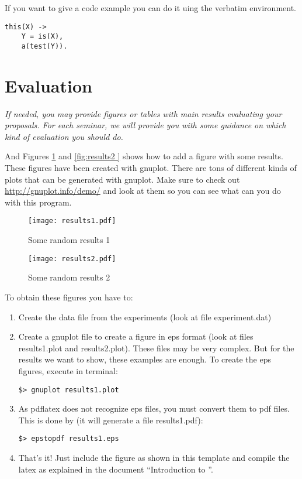 \documentclass[a4paper, 11pt]{article}
\begin{document}
If you want to give a code example you can do it uing the verbatim environment.
\begin{verbatim}
this(X) ->
    Y = is(X),
    a(test(Y)).
\end{verbatim}

\section{Evaluation}

\textit{If needed, you may provide figures or tables with main results
  evaluating your proposals. For each seminar, we will provide you
  with some guidance on which kind of evaluation you should do.}


And Figures \ref{fig:results1} and \ref{fig:results2 } shows how to
add a figure with some results. These figures have been created with
gnuplot. There are tons of different kinds of plots that can be
generated with gnuplot. Make sure to check out
\url{http://gnuplot.info/demo/} and look at them so you can see what
can you do with this program.


\begin{figure}
  \begin{center}
    \texttt{[image: results1.pdf]}
    \caption{Some random results 1}
    \label{fig:results1}
  \end{center}
\end{figure}


\begin{figure}
  \begin{center}
    \texttt{[image: results2.pdf]}
    \caption{Some random results 2}
    \label{fig:results2}
  \end{center}
\end{figure}

To obtain these figures you have to:
\begin{enumerate}

\item Create the data file from the experiments (look at file
  experiment.dat)

\item Create a gnuplot file to create a figure in eps format (look at
  files results1.plot and results2.plot). These files may be very
  complex. But for the results we want to show, these examples are
  enough. To create the eps figures, execute in terminal:

\begin{verbatim}
$> gnuplot results1.plot 
\end{verbatim}

\item As pdflatex does not recognize eps files, you must convert them
  to pdf files. This is done by (it will generate a file
  results1.pdf):

\begin{verbatim}
$> epstopdf results1.eps
\end{verbatim}

\item That's it! Just include the figure as shown in this template and
  compile the latex as explained in the document ``Introduction to
  \LaTeXe''.

\end{enumerate}
\end{document}
